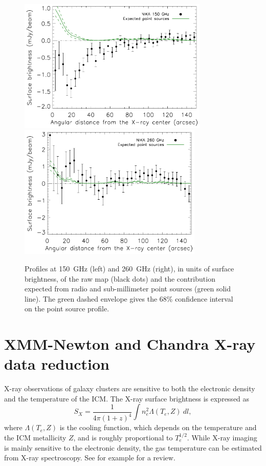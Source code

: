 \documentclass[traditabstract]{aa}
\begin{document}
\begin{figure}[h]
\centering
\includegraphics[height=6.4cm]{Figure/MACSJ1424_profile2mm_plus_ps.pdf}
\includegraphics[height=6.4cm]{Figure/MACSJ1424_profile1mm_plus_ps.pdf}
\caption{\footnotesize Profiles at 150~GHz (left) and 260~GHz (right), in units of surface brightness, of the raw map (black dots) and the contribution expected from radio and sub-millimeter point sources (green solid line). The green dashed envelope gives the 68\% confidence interval on the point source profile.}
\label{fig:flux_profiles}
\end{figure}

\section{XMM-Newton and Chandra X-ray data reduction}\label{sec:XMM_Newton_and_Chandra_X_ray_data_reduction}
X-ray observations of galaxy clusters are sensitive to both the electronic density and the temperature of the ICM. The X-ray surface brightness is expressed as 
\begin{equation}
        S_X = \frac{1}{4 \pi \left(1+z\right)^4} \int n_e^2 \Lambda(T_e, Z) \ dl,
        \label{eq:sx}
\end{equation}
where $\Lambda(T_e,Z)$ is the cooling function, which depends on the temperature and the ICM metallicity $Z$, and is roughly proportional to $T_e^{1/2}$. While X-ray imaging is mainly sensitive to the electronic density, the gas temperature can be estimated from X-ray spectroscopy. See for example \cite{bohringer2010} for a review.
\end{document}
